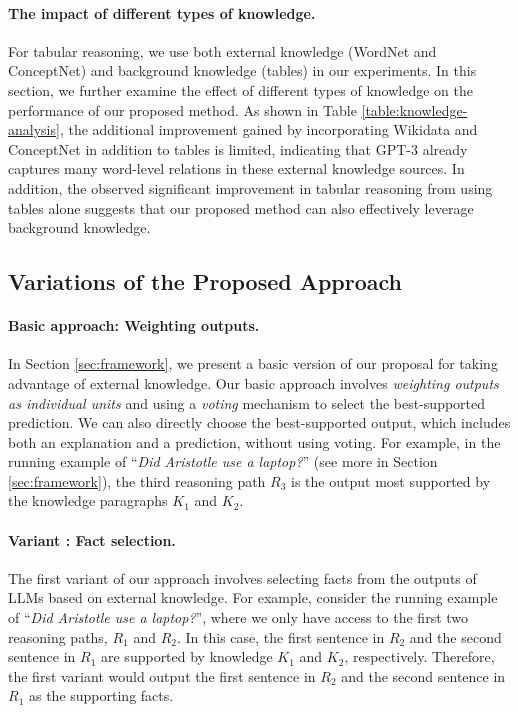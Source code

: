 \paragraph{The impact of different types of knowledge.} For tabular reasoning, we use both external knowledge (WordNet and ConceptNet) and background knowledge (tables) in our experiments. In this section, we further examine the effect of different types of knowledge on the performance of our proposed method. As shown in Table \ref{table:knowledge-analysis}, the additional improvement gained by incorporating Wikidata and ConceptNet in addition to tables is limited, indicating that GPT-3 already captures many word-level relations in these external knowledge sources. In addition, the observed significant improvement in tabular reasoning from using tables alone suggests that our proposed method can also effectively leverage background knowledge.

\subsection{Variations of the Proposed Approach}
\label{subsec:variations}
\paragraph{Basic approach: Weighting outputs.} In Section \ref{sec:framework}, we present a basic version of our proposal for taking advantage of external knowledge. Our basic approach involves \textit{weighting outputs as individual units} and using a \textit{voting} mechanism to select the best-supported prediction. We can also directly choose the best-supported output, which includes both an explanation and a prediction, without using voting. For example, in the running example of ``\textit{Did Aristotle use a laptop?}'' (see more in Section \ref{sec:framework}), the third reasoning path $R_3$ is the output most supported by the knowledge paragraphs $K_1$ and $K_2$.

\paragraph{Variant \uppercase\expandafter{}: Fact selection.} The first variant of our approach involves selecting facts from the outputs of LLMs based on external knowledge. For example, consider the running example of ``\textit{Did Aristotle use a laptop?}'', where we only have access to the first two reasoning paths, $R_1$ and $R_2$. In this case, the first sentence in $R_2$ and the second sentence in $R_1$ are supported by knowledge $K_1$ and $K_2$, respectively. Therefore, the first variant would output the first sentence in $R_2$ and the second sentence in $R_1$ as the supporting facts.

